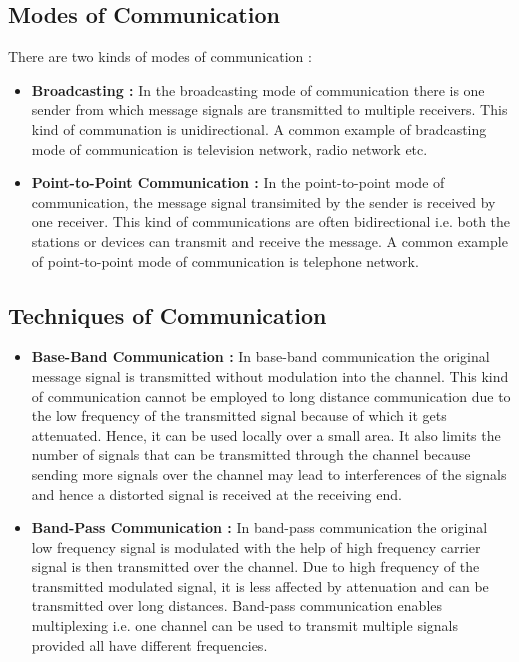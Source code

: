 \documentclass[12pt,a4paper]{article}%
\begin{document}
\begin{flushleft}
		\subsection{Modes of Communication}
		\begin{flushleft}
			There are two kinds of modes of communication :
			\begin{itemize}
				\item \textbf{Broadcasting : } In the broadcasting mode of communication there is one sender from which message signals are transmitted to multiple receivers. This kind of communation is unidirectional. A common example of
				bradcasting mode of communication is television network, radio network etc.
				\item \textbf{Point-to-Point Communication : } In the point-to-point mode of communication, the message signal transimited by the sender is received by one receiver. This kind of communications are often bidirectional i.e. both the 
				stations or devices can transmit and receive the message. A common example of point-to-point mode of communication is telephone network.\\\bigskip
			\end{itemize}
		\end{flushleft}
		
		\subsection{Techniques of Communication}
		\begin{flushleft}
			\begin{itemize}
				\item \textbf{Base-Band Communication : } In base-band communication the original message signal is transmitted without modulation into the channel. This kind of communication cannot be employed to long distance communication
				due to the low frequency of the transmitted signal because of which it gets attenuated. Hence, it can be used locally over a small area. It also limits the number of signals that can be
				transmitted through the channel because sending more signals over the channel may lead to interferences of the signals and hence a distorted signal is received at the receiving end.
				\item \textbf{Band-Pass Communication : } In band-pass communication the original low frequency signal is modulated with the help of high frequency carrier signal is then transmitted over the channel. Due to high frequency of
				the transmitted modulated signal, it is less affected by attenuation and can be transmitted over long distances. Band-pass communication enables multiplexing i.e. one channel can be used
				to transmit multiple signals provided all have different frequencies.\\\bigskip
			\end{itemize}
		\end{flushleft}
		
	\end{flushleft}
	\pagebreak
\end{document}
